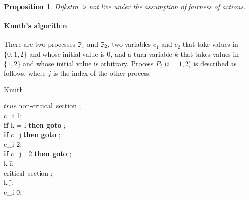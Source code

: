 \documentclass[copyright,creativecommons]{eptcs}
\newtheorem{proposition}[theorem]{Proposition}
\newcommand{\dijkstra}{{\it Dijkstra}}
\newcommand{\dijkstraa}{{\sf Dijkstra}} \newcommand{\dijkstrab}{\dijkstra}
\newcommand{\proc}{{\tt P}}
\begin{document}
\begin{proposition}\label{prop:dijkstra} 
\dijkstraa\ is not live under the assumption of fairness of actions.
\end{proposition}


\paragraph{Knuth's algorithm}
There are two processes $\proc_1$ and $\proc_2$, two variables $c_1$ and
$c_2$ that take values in $\{0, 1, 2\}$ and whose initial value is 0, and a
turn variable $k$ that takes values in $\{1, 2\}$
and whose initial value is arbitrary.  Process $P_i$ ($i=1,2$) is
described as follows, where $j$ is the index of the other process:
\begin{algorithm}{Knuth}{}
\begin{WHILE}{$true$}
\langle \mbox{non-critical section} \rangle; \\
c_i \= 1;\\
{\bf if} \; k = i  \; {\bf then \; goto} ;\\
\; {\bf if} \; c_j    \; {\bf then \; goto} ;\\
c_i \= 2;\\
{\bf if} \; c_j =2  \; {\bf then \; goto} ;\\
k \= i;\\
\langle \mbox{critical section} \rangle; \\
k \= j; \\
c_i \= 0;
\end{WHILE}
\end{algorithm}
\end{document}
